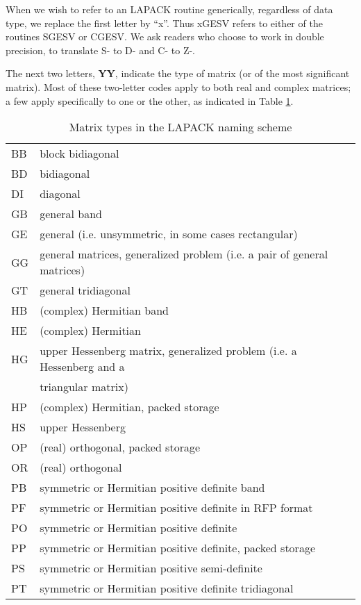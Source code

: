 When we wish to refer to an LAPACK routine generically, regardless
of data type, we replace the first letter by ``x''. Thus xGESV refers
to either of the routines SGESV or CGESV. We ask readers who choose to work in 
double precision, to translate S- to D- and C- to Z-.

The next two letters, {\bf YY}, indicate the type of matrix (or
of the most significant matrix).
Most of these two-letter codes apply to both real and complex matrices;
a few apply specifically to one or the other, as indicated in Table
\ref{tabtypes}.

\begin{table}[h]
\caption{Matrix types in the LAPACK naming scheme}
\label{tabtypes}
\begin{center}
\begin{tabular} { l l }
BB  &  block bidiagonal \\
BD  &  bidiagonal \\
DI  &  diagonal \\
GB  &  general band \\
GE  &  general (i.e. unsymmetric, in some cases rectangular) \\
GG  &  general matrices, generalized problem (i.e. a pair of general matrices) \\
GT  &  general tridiagonal \\
HB  &  (complex) Hermitian band \\
HE  &  (complex) Hermitian \\
HG  &  upper Hessenberg matrix, generalized problem (i.e. a Hessenberg and a \\
    &  triangular matrix) \\
HP  &  (complex) Hermitian, packed storage \\
HS  &  upper Hessenberg \\
OP  &  (real) orthogonal, packed storage \\
OR  &  (real) orthogonal \\
PB  &  symmetric or Hermitian positive definite band \\
PF  &  symmetric or Hermitian positive definite in RFP format \\
PO  &  symmetric or Hermitian positive definite \\
PP  &  symmetric or Hermitian positive definite, packed storage \\
PS  &  symmetric or Hermitian positive semi-definite \\
PT  &  symmetric or Hermitian positive definite tridiagonal \\

\end{tabular}
\end{center}
\end{table}
